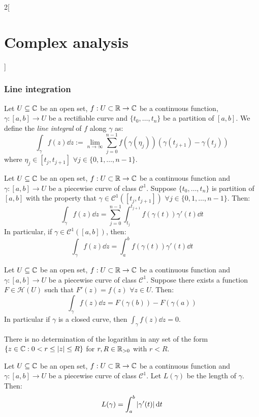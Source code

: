 \documentclass[../../../main.tex]{subfiles}
\begin{document}
\begin{multicols}{2}[\section{Complex analysis}]
  \subsubsection{Line integration}
  \begin{definition}
    Let $U\subseteq \mathbb{C}$ be an open set, $f:U\subset\mathbb{R}\rightarrow\mathbb{C}$ be a continuous function, $\gamma:[a,b]\rightarrow U$ be a rectifiable curve and $\{t_0,\ldots,t_n\}$ be a partition of $[a,b]$. We define the \emph{line integral} of $f$ along $\gamma$ as: $$\int_\gamma f(z)\dd{z}:=\lim_{n\to\infty}\sum_{j=0}^{n-1}f(\gamma(\eta_j))(\gamma(t_{j+1})-\gamma(t_j))$$ where $\eta_j\in[t_j,t_{j+1}]$ $\forall j\in\{0,1,\ldots,n-1\}$.
  \end{definition}
  \begin{definition}
    Let $U\subseteq \mathbb{C}$ be an open set, $f:U\subset\mathbb{R}\rightarrow\mathbb{C}$ be a continuous function and $\gamma:[a,b]\rightarrow U$ be a piecewise curve of class $\mathcal{C}^1$. Suppose $\{t_0,\ldots,t_n\}$ is partition of $[a,b]$ with the property that $\gamma\in\mathcal{C}^1([t_j,t_{j+1}])$ $\forall j\in\{0,1,\ldots,n-1\}$. Then: $$\int_\gamma f(z)\dd{z}=\sum_{j=0}^{n-1}\int_{t_j}^{t_{j+1}}f(\gamma(t))\gamma'(t)\dd{t}$$
    In particular, if $\gamma\in\mathcal{C}^1([a,b])$, then: $$\int_\gamma f(z)\dd{z}=\int_a^bf(\gamma(t))\gamma'(t)\dd{t}$$
  \end{definition}
  \begin{theorem}
    Let $U\subseteq \mathbb{C}$ be an open set, $f:U\subset\mathbb{R}\rightarrow\mathbb{C}$ be a continuous function and $\gamma:[a,b]\rightarrow U$ be a piecewise curve of class $\mathcal{C}^1$. Suppose there exists a function $F\in\mathcal{H}(U)$ such that $F'(z)=f(z)$ $\forall z\in U$. Then:
    $$\int_\gamma f(z)\dd{z}=F(\gamma(b))-F(\gamma(a))$$ In particular if $\gamma$ is a closed curve, then $\int_\gamma f(z)\dd{z}=0$.
  \end{theorem}
  \begin{corollary}
    There is no determination of the logarithm in any set of the form $\{z\in\mathbb{C}:0<r\leq\abs{z}\leq R\}$ for $r,R\in\mathbb{R}_{> 0}$ with $r<R$.
  \end{corollary}
  \begin{proposition}
    Let $U\subseteq \mathbb{C}$ be an open set, $f:U\subset\mathbb{R}\rightarrow\mathbb{C}$ be a continuous function and $\gamma:[a,b]\rightarrow U$ be a piecewise curve of class $\mathcal{C}^1$. Let $L(\gamma)$ be the length of $\gamma$. Then: $$L(\gamma)=\int_a^b\abs{\gamma'(t)}\dd{t}$$
  \end{proposition}
  \begin{proposition}

\end{proposition}
\end{multicols}
\end{document}
